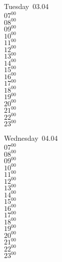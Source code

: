 \documentclass[11pt, a4paper]{book}\usepackage[]{graphicx}\usepackage[]{color}
\begin{document}
\begin{weekdaybox}
  Tuesday~03.04\\
  { 
  \vfill
  $07^{00}$\\
$08^{00}$\\
$09^{00}$\\
$10^{00}$\\
$11^{00}$\\
$12^{00}$\\
$13^{00}$\\
$14^{00}$\\
$15^{00}$\\
$16^{00}$\\
$17^{00}$\\
$18^{00}$\\
$19^{00}$\\
$20^{00}$\\
$21^{00}$\\
$22^{00}$\\
$23^{00}$\\
  }
\end{weekdaybox}
\begin{weekdaybox}
  Wednesday~04.04\\
  { 
  \vfill
  $07^{00}$\\
$08^{00}$\\
$09^{00}$\\
$10^{00}$\\
$11^{00}$\\
$12^{00}$\\
$13^{00}$\\
$14^{00}$\\
$15^{00}$\\
$16^{00}$\\
$17^{00}$\\
$18^{00}$\\
$19^{00}$\\
$20^{00}$\\
$21^{00}$\\
$22^{00}$\\
$23^{00}$\\
  }
\end{weekdaybox}
\clearpage
\begin{headerbox}
\end{headerbox}
\end{document}

